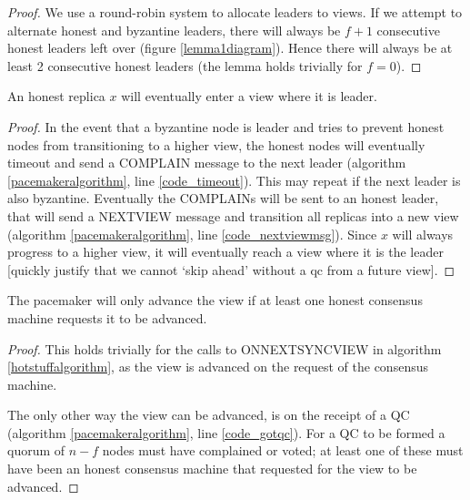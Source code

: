 \begin{proof}
	We use a round-robin system to allocate leaders to views. If we attempt to alternate honest and byzantine leaders, there will always be $f + 1$ consecutive honest leaders left over (figure \ref{lemma1diagram}). Hence there will always be at least 2 consecutive honest leaders (the lemma holds trivially for $f = 0$).
\end{proof}

\begin{lemma} \label{progressionlemma}
	An honest replica $x$ will eventually enter a view where it is leader.
\end{lemma}

\begin{proof}
	In the event that a byzantine node is leader and tries to prevent honest nodes from transitioning to a higher view, the honest nodes will eventually timeout and send a COMPLAIN message to the next leader (algorithm \ref{pacemakeralgorithm}, line \ref{code_timeout}). This may repeat if the next leader is also byzantine. Eventually the COMPLAINs will be sent to an honest leader, that will send a NEXT{\large V}IEW message and transition all replicas into a new view (algorithm \ref{pacemakeralgorithm}, line \ref{code_nextviewmsg}). Since $x$ will always progress to a higher view, it will eventually reach a view where it is the leader [quickly justify that we cannot `skip ahead' without a qc from a future view].
\end{proof}

\begin{theorem} \label{syncvalid}
	The pacemaker will only advance the view if at least one honest consensus machine requests it to be advanced.
\end{theorem}

\begin{proof}
	This holds trivially for the calls to ON{\large N}EXT{\large S}YNC{\large V}IEW in algorithm \ref{hotstuffalgorithm}, as the view is advanced on the request of the consensus machine.

	The only other way the view can be advanced, is on the receipt of a QC (algorithm \ref{pacemakeralgorithm}, line \ref{code_gotqc}). For a QC to be formed a quorum of $n - f$ nodes must have complained or voted; at least one of these must have been an honest consensus machine that requested for the view to be advanced.
\end{proof}

